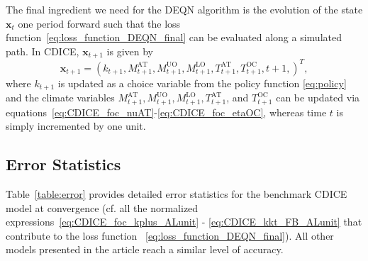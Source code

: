 \documentclass[11pt, a4paper, pdftex, twoside, dvipsnames]{article}
\renewcommand{\ref}{\cref}
\newcommand{\x}{\mathbf{x}}
\begin{document}
\begin{appendices}
The final ingredient we need for the DEQN algorithm is the evolution of the state $\x_t$ one period forward such that the loss function~\eqref{eq:loss_function_DEQN_final} can be evaluated along a simulated path. In CDICE,  $\x_{t+1}$ is given by
%
\begin{equation}
   \x_{t+1} =  \left(k_{t+1}, M^{\text{AT}}_{t+1}, M^{\text{UO}}_{t+1}, M^{\text{LO}}_{t+1}, T^{\text{AT}}_{t+1}, T^{\text{OC}}_{t+1}, t+1, \right)^T,
\end{equation}
%
where $k_{t+1}$ is updated as a choice variable from the policy function \cref{eq:policy} and the climate variables $M^{\text{AT}}_{t+1}, M^{\text{UO}}_{t+1}, M^{\text{LO}}_{t+1}, T^{\text{AT}}_{t+1}$, and $T^{\text{OC}}_{t+1}$ can be updated via equations~\eqref{eq:CDICE_foc_nuAT}-\eqref{eq:CDICE_foc_etaOC}, whereas time $t$ is simply incremented by one unit.

\subsection{Error Statistics}
\label{sec:error_stats}

Table~\ref{table:error} provides detailed error statistics 
for the benchmark CDICE model at convergence (cf. all the normalized expressions~\eqref{eq:CDICE_foc_kplus_ALunit} - \eqref{eq:CDICE_kkt_FB_ALunit} that contribute to the loss function ~\eqref{eq:loss_function_DEQN_final}). All other models presented in the article reach a similar level of accuracy. 


\end{appendices}
\end{document}
